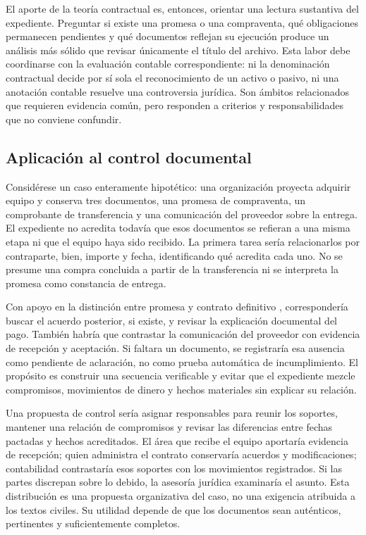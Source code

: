 {El aporte de la teoría contractual es, entonces, orientar una lectura sustantiva del expediente. Preguntar si existe una promesa o una compraventa, qué obligaciones permanecen pendientes y qué documentos reflejan su ejecución produce un análisis más sólido que revisar únicamente el título del archivo. Esta labor debe coordinarse con la evaluación contable correspondiente: ni la denominación contractual decide por sí sola el reconocimiento de un activo o pasivo, ni una anotación contable resuelve una controversia jurídica. Son ámbitos relacionados que requieren evidencia común, pero responden a criterios y responsabilidades que no conviene confundir.

\clearpage
\subsection*{Aplicación al control documental}

Considérese un caso enteramente hipotético: una organización proyecta adquirir equipo y conserva tres documentos, una promesa de compraventa, un comprobante de transferencia y una comunicación del proveedor sobre la entrega. El expediente no acredita todavía que esos documentos se refieran a una misma etapa ni que el equipo haya sido recibido. La primera tarea sería relacionarlos por contraparte, bien, importe y fecha, identificando qué acredita cada uno. No se presume una compra concluida a partir de la transferencia ni se interpreta la promesa como constancia de entrega.

Con apoyo en la distinción entre promesa y contrato definitivo \parencite[75--76]{zamoraContratos}, correspondería buscar el acuerdo posterior, si existe, y revisar la explicación documental del pago. También habría que contrastar la comunicación del proveedor con evidencia de recepción y aceptación. Si faltara un documento, se registraría esa ausencia como pendiente de aclaración, no como prueba automática de incumplimiento. El propósito es construir una secuencia verificable y evitar que el expediente mezcle compromisos, movimientos de dinero y hechos materiales sin explicar su relación.

Una propuesta de control sería asignar responsables para reunir los soportes, mantener una relación de compromisos y revisar las diferencias entre fechas pactadas y hechos acreditados. El área que recibe el equipo aportaría evidencia de recepción; quien administra el contrato conservaría acuerdos y modificaciones; contabilidad contrastaría esos soportes con los movimientos registrados. Si las partes discrepan sobre lo debido, la asesoría jurídica examinaría el asunto. Esta distribución es una propuesta organizativa del caso, no una exigencia atribuida a los textos civiles. Su utilidad depende de que los documentos sean auténticos, pertinentes y suficientemente completos.

}
